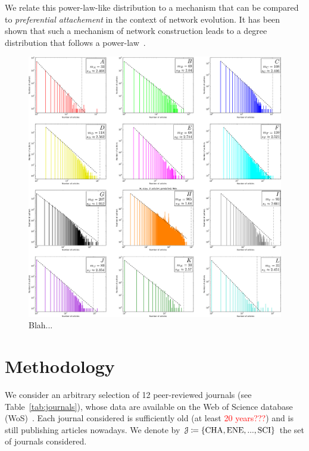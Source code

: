 \documentclass[aps,prl,floatfix,twocolumn]{revtex4-1}
\begin{document}
We relate this power-law-like distribution to a mechanism that can be compared to \emph{preferential attachement} in the context of network evolution. 
It has been shown that such a mechanism of network construction leads to a degree distribution that follows a power-law~\cite{Kra00}.

\begin{figure}
 \centering
 \includegraphics[width=\textwidth]{figures/ABCDEFGHIJKL.pdf}
 \caption{Blah...}
 \label{fig:1}
\end{figure}

\section{Methodology}
We consider an arbitrary selection of 12 peer-reviewed journals (see Table~\ref{tab:journals}), whose data are available on the Web of Science database (WoS)~\cite{WoS}. 
Each journal considered is sufficiently old (at least \textcolor{red}{20 years???}) and is still publishing articles nowadays. 
We denote by ${\cal J}\coloneqq\{{\rm CHA},{\rm ENE},...,{\rm SCI}\}$ the set of journals considered.
\end{document}
